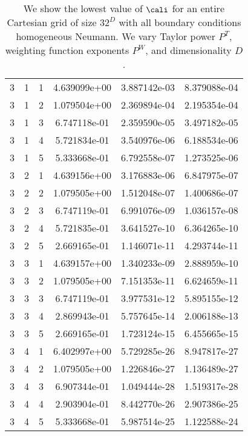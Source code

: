\documentclass{article}
\begin{document}
{\begin{small}
\begin{table}
\begin{center}
\begin{tabular}{|ccc|ccc|}
\hline
3 & 1 & 1 &  4.639099e+00 & 3.887142e-03 & 8.379088e-04 \\ 
3 & 1 & 2 &  1.079504e+00 & 2.369894e-04 & 2.195354e-04 \\ 
3 & 1 & 3 &  6.747118e-01 & 2.359590e-05 & 3.497182e-05 \\ 
3 & 1 & 4 &  5.721834e-01 & 3.540976e-06 & 6.188534e-06 \\ 
3 & 1 & 5 &  5.333668e-01 & 6.792558e-07 & 1.273525e-06 \\ 
3 & 2 & 1 &  4.639156e+00 & 3.176883e-06 & 6.847975e-07 \\ 
3 & 2 & 2 &  1.079505e+00 & 1.512048e-07 & 1.400686e-07 \\ 
3 & 2 & 3 &  6.747119e-01 & 6.991076e-09 & 1.036157e-08 \\ 
3 & 2 & 4 &  5.721835e-01 & 3.641527e-10 & 6.364265e-10 \\ 
3 & 2 & 5 &  2.669165e-01 & 1.146071e-11 & 4.293744e-11 \\ 
3 & 3 & 1 &  4.639157e+00 & 1.340233e-09 & 2.888959e-10 \\ 
3 & 3 & 2 &  1.079505e+00 & 7.151353e-11 & 6.624659e-11 \\ 
3 & 3 & 3 &  6.747119e-01 & 3.977531e-12 & 5.895155e-12 \\ 
3 & 3 & 4 &  2.869943e-01 & 5.757645e-14 & 2.006188e-13 \\ 
3 & 3 & 5 &  2.669165e-01 & 1.723124e-15 & 6.455665e-15 \\ 
3 & 4 & 1 &  6.402997e+00 & 5.729285e-26 & 8.947817e-27 \\ 
3 & 4 & 2 &  1.079505e+00 & 1.226846e-27 & 1.136489e-27 \\ 
3 & 4 & 3 &  6.907344e-01 & 1.049444e-28 & 1.519317e-28 \\ 
3 & 4 & 4 &  2.903904e-01 & 8.442770e-26 & 2.907386e-25 \\ 
3 & 4 & 5 &  5.333668e-01 & 5.987514e-25 & 1.122588e-24 \\ 
\hline
\end{tabular}
\end{center}
\label{fig::allRegSolvability}
\caption
    {
      We show the lowest value of
      $\cali$ for an entire Cartesian grid of size $32^D$
      with all
      boundary conditions homogeneous Neumann.
      We vary Taylor power $P^T$, weighting
      function exponents $P^W$, and dimensionality $D$. 
    }
\end{table}
\end{small}


}
\end{document}
